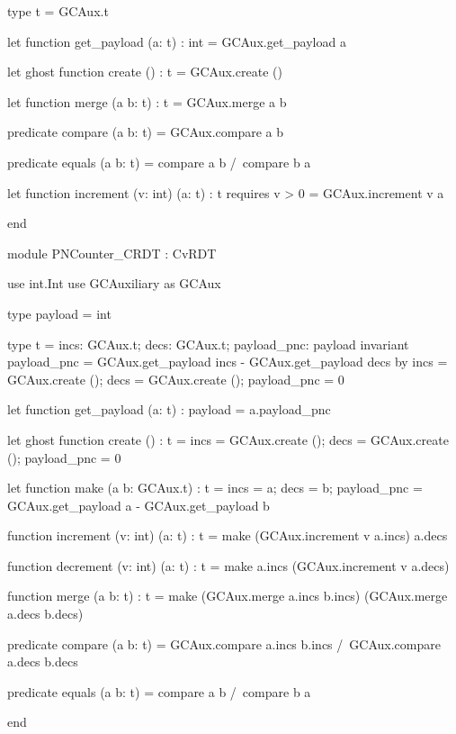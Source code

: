 \begin{Why3}
  type t = GCAux.t
  
  let function get_payload (a: t) : int
    = GCAux.get_payload a
  
  let ghost function create () : t
    = GCAux.create ()
  
  let function merge (a b: t) : t
    = GCAux.merge a b
  
  predicate compare (a b: t)
    = GCAux.compare a b
  
  predicate equals (a b: t)
  = compare a b /\ compare b a
  
  let function increment (v: int) (a: t) : t
    requires { v > 0 }
    = GCAux.increment v a

end

module PNCounter_CRDT : CvRDT
  
  use int.Int
  use GCAuxiliary as GCAux
  
  type payload = int
  
  type t = { incs: GCAux.t; decs: GCAux.t; payload_pnc: payload }
    invariant { payload_pnc = GCAux.get_payload incs - GCAux.get_payload decs }
    by { incs = GCAux.create (); decs = GCAux.create (); payload_pnc = 0 }
  
  let function get_payload (a: t) : payload
    = a.payload_pnc
  
  let ghost function create () : t
    = { incs = GCAux.create (); decs = GCAux.create (); payload_pnc = 0 }
  
  let function make (a b: GCAux.t) : t
    = { incs = a; decs = b;
        payload_pnc = GCAux.get_payload a - GCAux.get_payload b }
  
  function increment (v: int) (a: t) : t
    = make (GCAux.increment v a.incs) a.decs
  
  function decrement (v: int) (a: t) : t
    = make a.incs (GCAux.increment v a.decs)
  
  function merge (a b: t) : t
    = make (GCAux.merge a.incs b.incs) (GCAux.merge a.decs b.decs)
  
  predicate compare (a b: t)
    = GCAux.compare a.incs b.incs /\ GCAux.compare a.decs b.decs
  
  predicate equals (a b: t)
  = compare a b /\ compare b a

end
\end{Why3}
